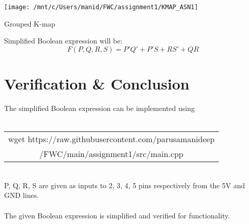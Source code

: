 \documentclass[journal,12pt,twocolumn]{IEEEtran}
\begin{document}
\begin{table}[h]
    \centering
    \texttt{[image: /mnt/c/Users/manid/FWC/assignment1/KMAP\_ASN1]}
    \vspace{4pt}
    \caption{Grouped K-map}
    \label{fig:my_label}
\end{table}
Simplified Boolean expression will be:
$$F(P,Q,R,S) = P'Q' + P'S + RS' + QR$$

\section{Verification \& Conclusion}
The simplified Boolean expression can be implemented using 
\\
\\
\vspace{10pt}
\begin{tabular}{|c|}
    \hline

wget https://raw.githubusercontent.com/parusamanideep
\\/FWC/main/assignment1/src/main.cpp

     \\ \hline
\end{tabular} \\
P, Q, R, S are given as inputs to 2, 3, 4, 5 pins respectively from the 5V and GND lines.
\\
\\
The given Boolean expression is simplified and verified for functionality.
\end{document}
